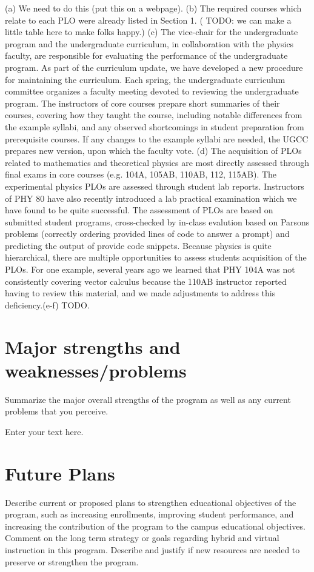 \documentclass[12pt]{article}
\begin{document}
(a) {\color{red} We need to do this (put this on a webpage).}
(b) The required courses which relate to each PLO were already listed in Section 1.
({\color{red} TODO: we can make a little table here to make folks happy.})
(c) The vice-chair for the undergraduate program and the undergraduate curriculum, in collaboration with the physics faculty, are responsible for evaluating the performance of the undergraduate program.
As part of the curriculum update, we have developed a new procedure for maintaining the curriculum.  Each spring, the undergraduate curriculum committee organizes a faculty meeting devoted to reviewing the undergraduate program.  The instructors of core courses prepare short summaries of their courses, covering how they taught the course, including notable differences from the example syllabi, and any observed shortcomings in student preparation from prerequisite courses.  If any changes to the example syllabi are needed, the UGCC prepares new version, upon which the faculty vote.
(d) The acquisition of PLOs related to mathematics and theoretical physics are most directly assessed through final exams in core courses (e.g. 104A, 105AB, 110AB, 112, 115AB).  The experimental physics PLOs are assessed through student lab reports.  Instructors of PHY 80 have also recently introduced a lab practical examination which we have found to be quite successful.  The assessment of PLOs are based on submitted student programs, cross-checked by in-class evalution based on Parsons problems (correctly ordering provided lines of code to answer a prompt) and predicting the output of provide code snippets.
Because physics is quite hierarchical, there are multiple opportunities to assess students acquisition of the PLOs.  For one example, several years ago we learned that PHY 104A was not consistently covering vector calculus because the 110AB instructor reported having to review this material, and we made adjustments to address this deficiency.(e-f) {\color{red} TODO.}
 
\section{Major strengths and weaknesses/problems}
Summarize the major overall strengths of the program as well as any current problems that you perceive. 

Enter your text here.

\section{Future Plans}
Describe current or proposed plans to strengthen educational objectives of the program, such as increasing enrollments, improving student performance, and increasing the contribution of the program to the campus educational objectives. Comment on the long term strategy or goals regarding hybrid and virtual instruction in this program. Describe and justify if new resources are needed to preserve or strengthen the program.
\end{document}
